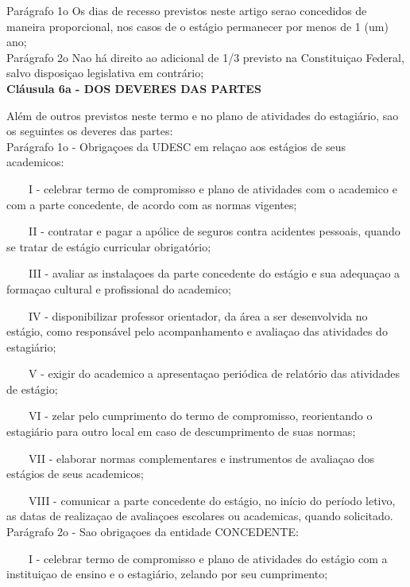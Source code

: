 \documentclass[10pt,a4paper]{article}
\begin{document}
Parágrafo 1o Os dias de recesso previstos neste artigo serao concedidos 
de maneira proporcional, nos casos de o estágio permanecer por menos de 
1 (um) ano;
\\

Parágrafo 2o Nao há direito ao adicional de 1/3 previsto na Constituiçao 
Federal, salvo disposiçao legislativa em contrário;
\\

\textbf{Cláusula 6a - DOS DEVERES DAS PARTES}

Além de outros previstos neste termo e no plano de atividades do 
estagiário, sao os seguintes os deveres das partes:
\\

Parágrafo 1o - Obrigaçoes da UDESC em relaçao aos estágios de seus 
academicos:

\ \ \ \ I - celebrar termo de compromisso e plano de atividades com o 
academico e com a parte concedente, de acordo com as normas vigentes;

\ \ \ \ II - contratar e pagar a apólice de seguros contra acidentes 
pessoais, quando se tratar de estágio curricular obrigatório;

\ \ \ \ III - avaliar as instalaçoes da parte concedente do estágio e 
sua adequaçao a formaçao cultural e profissional do academico;

\ \ \ \ IV - disponibilizar professor orientador, da área a ser 
desenvolvida no estágio, como responsável pelo acompanhamento e 
avaliaçao das atividades do estagiário;

\ \ \ \ V - exigir do academico a apresentaçao periódica de relatório 
das atividades de estágio;

\ \ \ \ VI - zelar pelo cumprimento do termo de compromisso, 
reorientando o estagiário para outro local em caso de descumprimento de 
suas normas;





\ \ \ \ VII - elaborar normas complementares e instrumentos de avaliaçao 
dos estágios de seus academicos;

\ \ \ \ VIII - comunicar a parte concedente do estágio, no início do 
período letivo, as datas de realizaçao de avaliaçoes escolares ou 
academicas, quando solicitado.
\\

Parágrafo 2o - Sao obrigaçoes da entidade CONCEDENTE:

\ \ \ \ I - celebrar termo de compromisso e plano de atividades do 
estágio com a instituiçao de ensino e o estagiário, zelando por seu 
cumprimento;
\end{document}

